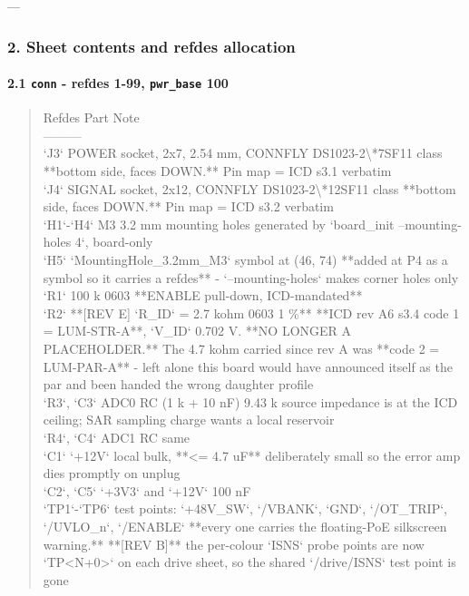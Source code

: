 \documentclass[11pt,a4paper]{article}
\begin{document}
---

\subsubsection*{2. Sheet contents and refdes allocation}
\paragraph*{2.1 \texttt{conn} - refdes 1-99, \texttt{pwr\_base} 100}
\begin{quote}\small\ttfamily\raggedright
\textbar{} Refdes \textbar{} Part \textbar{} Note \textbar{}\\
\textbar{}---\textbar{}---\textbar{}---\textbar{}\\
\textbar{} `J3` \textbar{} POWER socket, 2x7, 2.54 mm, CONNFLY DS1023-2\textbackslash{}{*}7SF11 class \textbar{} {*}{*}bottom side, faces DOWN.{*}{*} Pin map = ICD s3.1 verbatim \textbar{}\\
\textbar{} `J4` \textbar{} SIGNAL socket, 2x12, CONNFLY DS1023-2\textbackslash{}{*}12SF11 class \textbar{} {*}{*}bottom side, faces DOWN.{*}{*} Pin map = ICD s3.2 verbatim \textbar{}\\
\textbar{} `H1`-`H4` \textbar{} M3 3.2 mm mounting holes \textbar{} generated by `board\_init --mounting-holes 4`, board-only \textbar{}\\
\textbar{} `H5` \textbar{} `MountingHole\_3.2mm\_M3` symbol at (46, 74) \textbar{} {*}{*}added at P4 as a symbol so it carries a refdes{*}{*} - `--mounting-holes` makes corner holes only \textbar{}\\
\textbar{} `R1` \textbar{} 100 k 0603 \textbar{} {*}{*}ENABLE pull-down, ICD-mandated{*}{*} \textbar{}\\
\textbar{} `R2` \textbar{} {*}{*}{[}REV E{]} `R\_ID` = 2.7 kohm 0603 1 \%{*}{*} \textbar{} {*}{*}ICD rev A6 s3.4 code 1 = LUM-STR-A{*}{*}, `V\_ID` 0.702 V. {*}{*}NO LONGER A PLACEHOLDER.{*}{*} The 4.7 kohm carried since rev A was {*}{*}code 2 = LUM-PAR-A{*}{*} - left alone this board would have announced itself as the par and been handed the wrong daughter profile \textbar{}\\
\textbar{} `R3`, `C3` \textbar{} ADC0 RC (1 k + 10 nF) \textbar{} 9.43 k source impedance is at the ICD ceiling; SAR sampling charge wants a local reservoir \textbar{}\\
\textbar{} `R4`, `C4` \textbar{} ADC1 RC \textbar{} same \textbar{}\\
\textbar{} `C1` \textbar{} `+12V` local bulk, {*}{*}\textless{}= 4.7 uF{*}{*} \textbar{} deliberately small so the error amp dies promptly on unplug \textbar{}\\
\textbar{} `C2`, `C5` \textbar{} `+3V3` and `+12V` 100 nF \textbar{} \textbar{}\\
\textbar{} `TP1`-`TP6` \textbar{} test points: `+48V\_SW`, `/VBANK`, `GND`, `/OT\_TRIP`, `/UVLO\_n`, `/ENABLE` \textbar{} {*}{*}every one carries the floating-PoE silkscreen warning.{*}{*} {*}{*}{[}REV B{]}{*}{*} the per-colour `ISNS` probe points are now `TP\textless{}N+0\textgreater{}` on each drive sheet, so the shared `/drive/ISNS` test point is gone \textbar{}
\end{quote}
\end{document}
